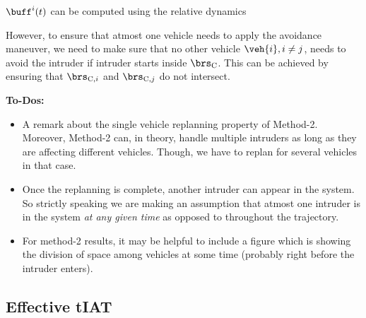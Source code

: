 $\buff^i(t)$ can be computed using the relative dynamics 

However, to ensure that atmost one vehicle needs to apply the avoidance maneuver, we need to make sure that no other vehicle $\veh{i}, i \neq j$, needs to avoid the intruder if intruder starts inside $\brs_\text{C}$. This can  be achieved by ensuring that $\brs_{\text{C},i}$ and $\brs_{\text{C},j}$ do not intersect.







\textbf{To-Dos:}
\begin{itemize}
\item A remark about the single vehicle replanning property of Method-2. Moreover, Method-2 can, in theory, handle multiple intruders as long as they are affecting different vehicles. Though, we have to replan for several vehicles in that case. 
\item Once the replanning is complete, another intruder can appear in the system. So strictly speaking we are making an assumption that atmost one intruder is in the system \textit{at any given time} as opposed to throughout the trajectory.
\item For method-2 results, it may be helpful to include a figure which is showing the division of space among vehicles at some time (probably right before the intruder enters). 
\end{itemize}

\subsection{Effective tIAT}